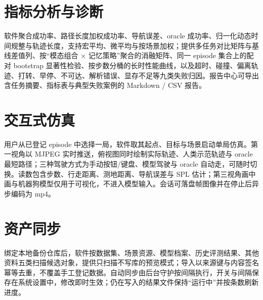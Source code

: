 
\section{指标分析与诊断}

软件聚合成功率、路径长度加权成功率、导航误差、oracle 成功率、归一化动态时间规整与轨迹长度，支持宏平均、微平均与按场景加权；提供多任务对比矩阵与基线差值列、按“模态组合 × 记忆策略”聚合的消融矩阵、同一 episode 集合上的配对 bootstrap 显著性检验、按步数分桶的长时性能曲线，以及超时、碰撞、偏离轨迹、打转、早停、不可达、解析错误、显存不足等九类失败归因。报告中心可导出含任务摘要、指标表与典型失败案例的 Markdown / CSV 报告。


\section{交互式仿真}

用户从已登记 episode 中选择一局，软件取其起点、目标与场景启动单局仿真。第一视角以 MJPEG 实时推送，俯视图同时绘制实际轨迹、人类示范轨迹与 oracle 最短路径；三种驾驶方式为手动按钮/键盘、模型驾驶与 oracle 自动走，可随时切换。读数包含步数、行走距离、测地距离、导航误差与 SPL 估计；第三视角画中画与机器狗模型仅用于可视化，不进入模型输入。会话可落盘帧图像并在停止后异步编码为 mp4。


\section{资产同步}

绑定本地备份仓库后，软件按数据集、场景资源、模型档案、历史评测结果、其他资料五类扫描候选对象，提供只扫描不写库的预览模式；导入以来源键与内容签名幂等去重，不覆盖手工登记数据。自动同步由后台守护按间隔执行，开关与间隔保存在系统设置中，修改即时生效；仍在写入的结果文件保持“运行中”并按条数刷新进度。


